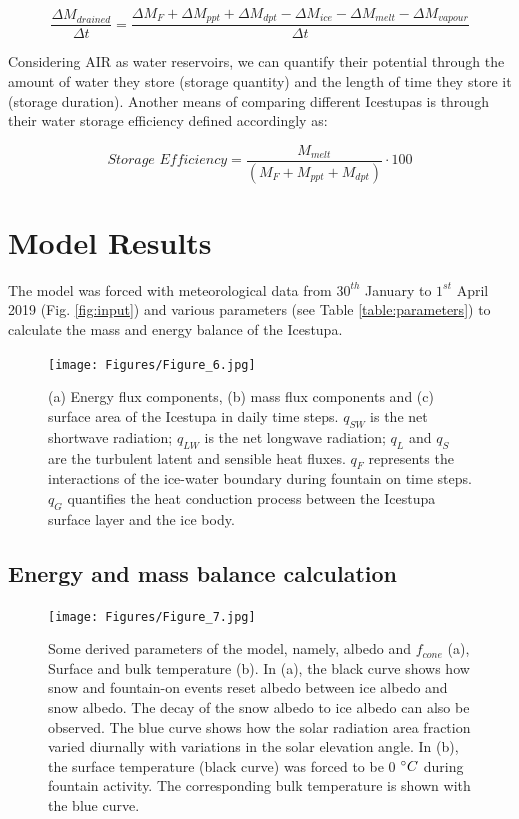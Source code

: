 \documentclass[utf8]{frontiersSCNS} %
\begin{document}
\begin{equation} \frac{\Delta M_{drained}}{\Delta t} = \frac{\Delta M_{F} + \Delta M_{ppt} + \Delta M_{dpt} - \Delta
M_{ice} -\Delta M_{melt} - \Delta M_{vapour}}{\Delta t} \end{equation}

Considering AIR as water reservoirs, we can quantify their potential through the amount of water they store (storage
quantity) and the length of time they store it (storage duration). Another means of comparing different Icestupas is
through their water storage efficiency defined accordingly as:

\begin{equation} \textit{Storage Efficiency} = \frac{M_{melt}}{(M_F+M_{ppt}+M_{dpt})} \cdot 100 \end{equation}



\section{Model Results} The model was forced with meteorological data from $30^{th}$ January to $1^{st}$ April
2019\textbf{} (Fig. \ref{fig:input}) and various parameters (see Table \ref{table:parameters}) to calculate the mass and
energy balance of the Icestupa.

  \begin{figure} \begin{center} \texttt{[image: Figures/Figure\_6.jpg]} \end{center} \caption{(a)
    Energy flux components, (b) mass flux components and (c) surface area of the Icestupa in daily time steps. $q_{SW}$
    is the net shortwave radiation; $q_{LW}$ is the net longwave radiation; $q_{L}$ and $q_{S}$ are the turbulent latent
    and sensible heat fluxes. $q_{F}$ represents the interactions of the ice-water boundary during fountain on time
steps.  $q_{G}$ quantifies the heat conduction process between the Icestupa surface layer and the ice body. }
\label{fig:EB} \end{figure}
  

\subsection{Energy and mass balance calculation}

  \begin{figure} \begin{center} \texttt{[image: Figures/Figure\_7.jpg]} \end{center} \caption{Some derived
    parameters of the model, namely, albedo and $f_{cone}$ (a), Surface and bulk temperature (b). In (a), the black
    curve shows how snow and fountain-on events reset albedo between ice albedo and snow albedo.  The decay of the snow
    albedo to ice albedo can also be observed. The blue curve shows how the solar radiation area fraction varied
diurnally with variations in the solar elevation angle. In (b), the surface temperature (black curve) was forced to be 0
$\degree C$ during fountain activity. The corresponding bulk temperature is shown with the blue curve.}
\label{fig:derived} \end{figure}
  
\end{document}
